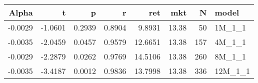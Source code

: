 \begin{table}[ht]
\centering
\begin{tabular}{rrrrrrrl}
  \hline
Alpha & t & p & r & ret & mkt & N & model \\ 
  \hline
-0.0029 & -1.0601 & 0.2939 & 0.8904 & 9.8931 & 13.38 & 50 & 1M\_1\_1 \\ 
  -0.0035 & -2.0459 & 0.0457 & 0.9579 & 12.6651 & 13.38 & 157 & 4M\_1\_1 \\ 
  -0.0029 & -2.2879 & 0.0262 & 0.9769 & 14.5106 & 13.38 & 260 & 8M\_1\_1 \\ 
  -0.0035 & -3.4187 & 0.0012 & 0.9836 & 13.7998 & 13.38 & 336 & 12M\_1\_1 \\ 
   \hline
\end{tabular}
\end{table}

